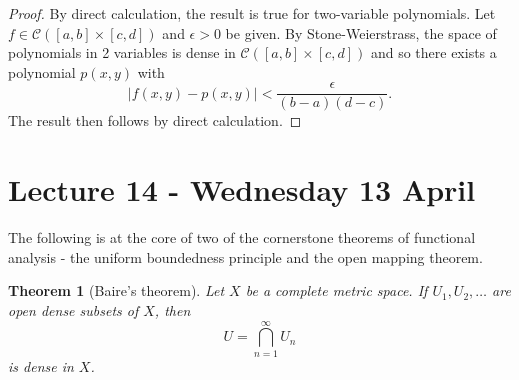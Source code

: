 \documentclass[10pt, oneside, reqno]{amsart}
\theoremstyle{plain}%
\newtheorem{thm}{Theorem}[section]
\theoremstyle{definition}
\theoremstyle{remark}
\begin{document}
\begin{proof}
	By direct calculation, the result is true for two-variable polynomials.  Let $f \in \mathcal C([a,b] \times [c,d])$ and $\epsilon > 0$ be given.  By Stone-Weierstrass, the space of polynomials in 2 variables is dense in $\mathcal C([a,b] \times [c,d])$ and so there exists a polynomial $p(x,y)$ with \[
		|f(x,y) - p(x,y)| < \frac{\epsilon}{(b-a)(d-c)}.
	\]  The result then follows by direct calculation.
\end{proof}

\section{Lecture 14 - Wednesday 13 April} %
\label{sec:lecture_14_wednesday_13_april}
The following is at the core of two of the cornerstone theorems of functional analysis - the uniform boundedness principle and the open mapping theorem.

\begin{thm}[Baire's theorem]
	Let $X$ be a complete metric space.  If $U_1, U_2, \dots$ are open dense subsets of $X$, then \[
		U = \bigcap_{n=1}^\infty U_n
	\] is dense in $X$.  
\end{thm}
\end{document}
